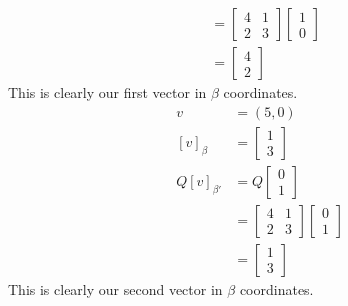 \documentclass[answers,12pt,addpoints]{exam}
\begin{document}
\begin{questions}
\begin{solution}
\begin{align*}
            &= \begin{bmatrix}
                4 & 1\\
                2 & 3
            \end{bmatrix}\begin{bmatrix}
                1\\
                0
            \end{bmatrix}\\
            &= \begin{bmatrix}
                4\\
                2
            \end{bmatrix}
        \end{align*} 
        This is clearly our first vector in $\beta$ coordinates.\\
        \begin{align*}
            v &= (5,0)\\
            [v]_{\beta} &= \begin{bmatrix}
                1\\
                3
            \end{bmatrix}   \\
            Q[v]_{\beta'} &= Q\begin{bmatrix}
                0\\
                1
            \end{bmatrix}\\
            &= \begin{bmatrix}
                4 & 1\\
                2 & 3
            \end{bmatrix}\begin{bmatrix}
                0\\
                1
            \end{bmatrix}\\
            &= \begin{bmatrix}
                1\\
                3
            \end{bmatrix}
        \end{align*}
        This is clearly our second vector in $\beta$ coordinates.\\
    \end{solution}


\end{questions}
\end{document}
